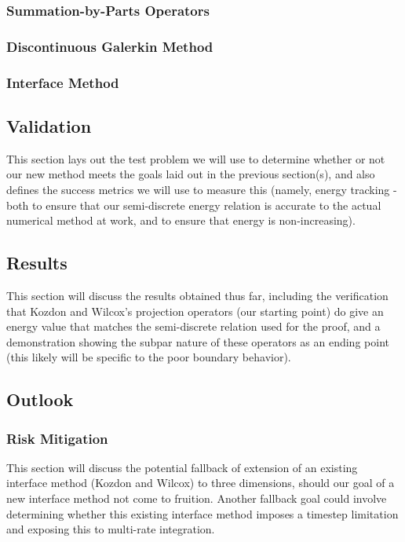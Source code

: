 \subsubsection{Summation-by-Parts Operators}

\subsubsection{Discontinuous Galerkin Method}

\subsubsection{Interface Method}

\subsection{Validation}

This section lays out the test problem we will use to determine
whether or not our new method meets the goals laid out in the
previous section(s), and also defines the success metrics we will
use to measure this (namely, energy tracking - both to ensure
that our semi-discrete energy relation is accurate to the actual
numerical method at work, and to ensure that energy is non-increasing).

\subsection{Results}

This section will discuss the results obtained thus far, including the
verification that Kozdon and Wilcox's projection operators (our starting point)
do give an energy value that matches the semi-discrete relation used for the
proof, and a demonstration showing the subpar nature of these operators as
an ending point (this likely will be specific to the poor boundary behavior).

\subsection{Outlook}

\subsubsection{Risk Mitigation}

This section will discuss the potential fallback of extension of an existing
interface method (Kozdon and Wilcox) to three dimensions, should our goal
of a new interface method not come to fruition. Another fallback goal could
involve determining whether this existing interface method imposes a timestep
limitation and exposing this to multi-rate integration.

